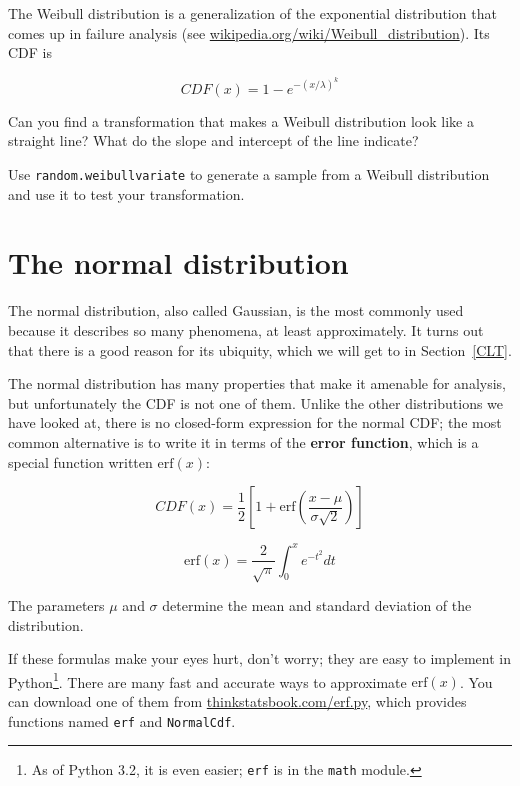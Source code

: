 \documentclass[12pt]{book}
\begin{document}
\begin{ex}
\label{weibull}

The Weibull distribution is a generalization of the exponential
distribution that comes up in failure analysis
(see \url{wikipedia.org/wiki/Weibull_distribution}).  Its CDF is

\[ CDF(x) = 1 - e^{-(x / \lambda)^k} \]

Can you find a transformation that makes a Weibull distribution look
like a straight line?  What do the slope and intercept of the
line indicate?

Use {\tt random.weibullvariate} to generate a sample from a
Weibull distribution and use it to test your transformation.

\end{ex}


\section{The normal distribution}

\newcommand{\erf}{\mathrm{erf}}

The normal distribution, also called Gaussian, is the most commonly
used because it describes so many phenomena, at least approximately.
It turns out that there is a good reason for its ubiquity, which we
will get to in Section~\ref{CLT}.

The normal distribution has many properties that make it amenable for
analysis, but unfortunately the CDF is not one of them.  Unlike the
other distributions we have looked at, there is no closed-form
expression for the normal CDF; the most common alternative is to write
it in terms of the {\bf error function}, which is a special function
written $\erf(x)$:

\[ CDF(x) = \frac{1}{2} \left[ 1 +
  \erf \left( \frac{x - \mu}{\sigma \sqrt{2}} \right) \right] \]

\[ \erf(x) = \frac{2}{\sqrt{\pi}} \int_{0}^x e^{-t^2} dt \]

The parameters $\mu$ and $\sigma$ determine the mean and standard
deviation of the distribution.

If these formulas make your eyes hurt, don't worry; they are easy to
implement in Python\footnote{As of Python 3.2, it is even easier; 
{\tt erf} is in the {\tt math} module.}.  There are many fast and
accurate ways to approximate $\erf(x)$.  You can download one of them
from \url{thinkstatsbook.com/erf.py}, which provides functions named
{\tt erf} and {\tt NormalCdf}.
\end{document}
